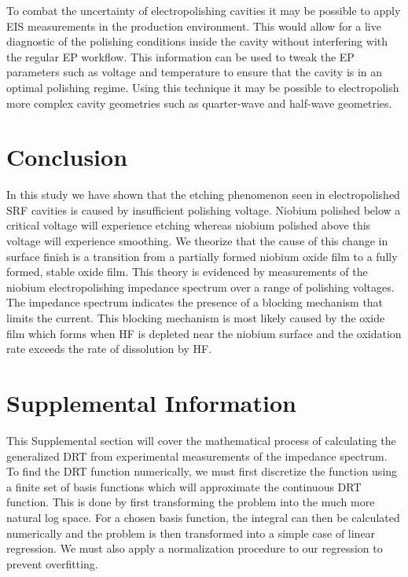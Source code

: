\documentclass{revtex4-2}
\begin{document}
To combat the uncertainty of electropolishing cavities it may be possible to apply EIS measurements in the production environment. This would allow for a live diagnostic of the polishing conditions inside the cavity without interfering with the regular EP workflow. This information can be used to tweak the EP parameters such as voltage and temperature to ensure that the cavity is in an optimal polishing regime. Using this technique it may be possible to electropolish more complex cavity geometries such as quarter-wave and half-wave geometries.



\section{Conclusion}
\label{sec:org57282ed}
In this study we have shown that the etching phenomenon seen in electropolished SRF cavities is caused by insufficient polishing voltage. Niobium polished below a critical voltage will experience etching whereas niobium polished above this voltage will experience smoothing. We theorize that the cause of this change in surface finish is a transition from a partially formed niobium oxide film to a fully formed, stable oxide film. This theory is evidenced by measurements of the niobium electropolishing impedance spectrum over a range of polishing voltages. The impedance spectrum indicates the presence of a blocking mechanism that limits the current. This blocking mechanism is most likely caused by the oxide film which forms when HF is depleted near the niobium surface and the oxidation rate exceeds the rate of dissolution by HF.


\section{Supplemental Information}
\label{sec:sup}

This Supplemental section will cover the mathematical process of calculating the generalized DRT from experimental measurements of the impedance spectrum. To find the DRT function numerically, we must first discretize the function using a finite set of basis functions which will approximate the continuous DRT function. This is done by first transforming the problem into the much more natural log space. For a chosen basis function, the integral can then be calculated numerically and the problem is then transformed into a simple case of linear regression. We must also apply a normalization procedure to our regression to prevent overfitting.
\end{document}
